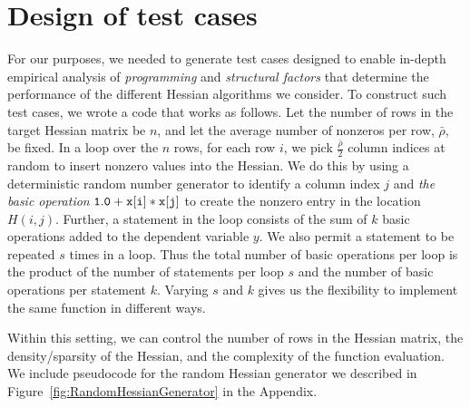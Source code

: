 \documentclass[11pt, twocolumn]{article}
\begin{document}
\section*{Design of test cases}

For our purposes, we needed to generate test cases designed to enable in-depth
empirical analysis of {\em programming} and {\em structural factors} that 
determine the performance of the  different Hessian algorithms we consider. 
To construct such test cases, we wrote a code that works as follows. 
Let the number of rows in the target Hessian matrix be $n$, and
let the average number of nonzeros per row, $\bar{\rho}$, be fixed.
In a loop over the $n$ rows, for each row $i$, 
we pick $\frac{\bar{\rho}}{2}$ column indices at random to insert nonzero values into the Hessian.    
We do this by using a deterministic random number generator to identify a column index $j$ and {\em the basic operation} 
$\tt 1.0+x[i]*x[j]$ to create the nonzero entry in the location $H(i,j)$. 
Further, a statement in the loop consists of the sum of $k$ basic operations added to the dependent variable $y$. We also permit a statement to be repeated $s$ times in a loop. Thus the total number of basic operations per loop is the product of the number of statements per loop $s$ and the number of basic operations per statement $k$. 
Varying $s$ and $k$ gives us the flexibility to implement the same function in different ways.

Within this setting, we can control the number of rows in the Hessian matrix, the density/sparsity of the Hessian, and the complexity of the function evaluation. 
We include pseudocode for the random Hessian generator we described in 
Figure~\ref{fig:RandomHessianGenerator} in the Appendix.
\end{document}

